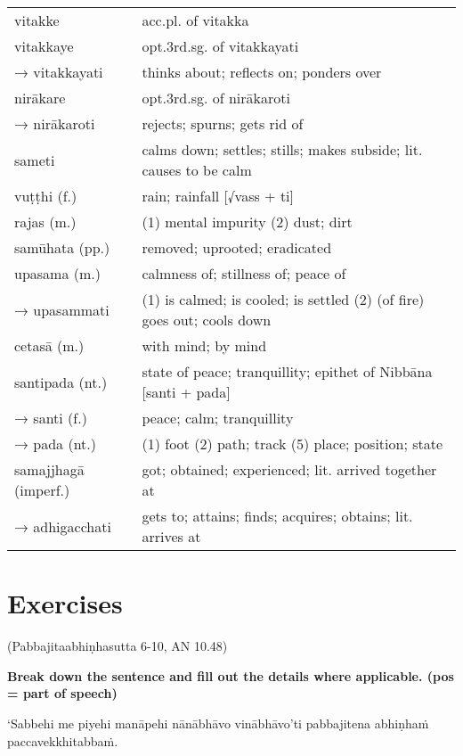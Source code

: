 \documentclass[11pt,oneside]{memoir}
\begin{document}
\begin{longtable}{L{\colOne} L{\colTwo}}
vitakke & acc.pl. of vitakka\\[0pt]
vitakkaye & opt.3rd.sg. of vitakkayati\\[0pt]
→ vitakkayati & thinks about; reflects on; ponders over\\[0pt]
nirākare & opt.3rd.sg. of nirākaroti\\[0pt]
→ nirākaroti & rejects; spurns; gets rid of\\[0pt]
sameti & calms down; settles; stills; makes subside; lit. causes to be calm\\[0pt]
vuṭṭhi (f.) & rain; rainfall [√vass + ti]\\[0pt]
rajas (m.) & (1) mental impurity (2) dust; dirt\\[0pt]
samūhata (pp.) & removed; uprooted; eradicated\\[0pt]
upasama (m.) & calmness of; stillness of; peace of\\[0pt]
→ upasammati & (1) is calmed; is cooled; is settled (2) (of fire) goes out; cools down\\[0pt]
cetasā (m.) & with mind; by mind\\[0pt]
santipada (nt.) & state of peace; tranquillity; epithet of Nibbāna [santi + pada]\\[0pt]
→ santi (f.) & peace; calm; tranquillity\\[0pt]
→ pada (nt.) & (1) foot (2) path; track (5) place; position; state\\[0pt]
samajjhagā (imperf.) & got; obtained; experienced; lit. arrived together at\\[0pt]
→ adhigacchati & gets to; attains; finds; acquires; obtains; lit. arrives at\\[0pt]
\end{longtable}

\clearpage

\section{Exercises}
\label{sec:org03b6455}

(Pabbajitaabhiṇhasutta 6-10, AN 10.48)

\textbf{\textbf{Break down the sentence and fill out the details where applicable. (pos = part of speech)}}

\renewcommand{\arraystretch}{1.6}

‘Sabbehi me piyehi manāpehi nānābhāvo vinābhāvo’ti pabbajitena abhiṇhaṁ paccavekkhitabbaṁ.
\end{document}

